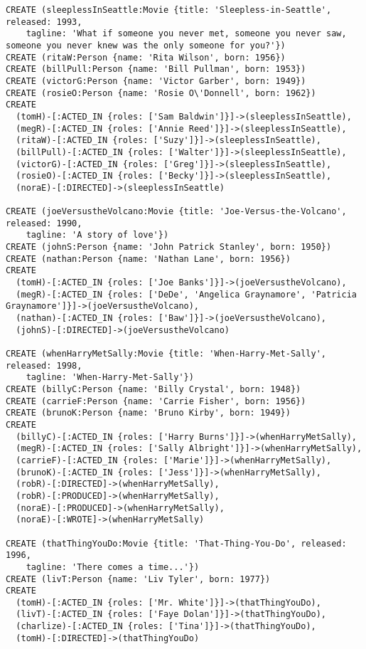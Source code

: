 \begin{lstlisting}
CREATE (sleeplessInSeattle:Movie {title: 'Sleepless-in-Seattle', released: 1993,
    tagline: 'What if someone you never met, someone you never saw, someone you never knew was the only someone for you?'})
CREATE (ritaW:Person {name: 'Rita Wilson', born: 1956})
CREATE (billPull:Person {name: 'Bill Pullman', born: 1953})
CREATE (victorG:Person {name: 'Victor Garber', born: 1949})
CREATE (rosieO:Person {name: 'Rosie O\'Donnell', born: 1962})
CREATE
  (tomH)-[:ACTED_IN {roles: ['Sam Baldwin']}]->(sleeplessInSeattle),
  (megR)-[:ACTED_IN {roles: ['Annie Reed']}]->(sleeplessInSeattle),
  (ritaW)-[:ACTED_IN {roles: ['Suzy']}]->(sleeplessInSeattle),
  (billPull)-[:ACTED_IN {roles: ['Walter']}]->(sleeplessInSeattle),
  (victorG)-[:ACTED_IN {roles: ['Greg']}]->(sleeplessInSeattle),
  (rosieO)-[:ACTED_IN {roles: ['Becky']}]->(sleeplessInSeattle),
  (noraE)-[:DIRECTED]->(sleeplessInSeattle)

CREATE (joeVersustheVolcano:Movie {title: 'Joe-Versus-the-Volcano', released: 1990,
    tagline: 'A story of love'})
CREATE (johnS:Person {name: 'John Patrick Stanley', born: 1950})
CREATE (nathan:Person {name: 'Nathan Lane', born: 1956})
CREATE
  (tomH)-[:ACTED_IN {roles: ['Joe Banks']}]->(joeVersustheVolcano),
  (megR)-[:ACTED_IN {roles: ['DeDe', 'Angelica Graynamore', 'Patricia Graynamore']}]->(joeVersustheVolcano),
  (nathan)-[:ACTED_IN {roles: ['Baw']}]->(joeVersustheVolcano),
  (johnS)-[:DIRECTED]->(joeVersustheVolcano)

CREATE (whenHarryMetSally:Movie {title: 'When-Harry-Met-Sally', released: 1998,
    tagline: 'When-Harry-Met-Sally'})
CREATE (billyC:Person {name: 'Billy Crystal', born: 1948})
CREATE (carrieF:Person {name: 'Carrie Fisher', born: 1956})
CREATE (brunoK:Person {name: 'Bruno Kirby', born: 1949})
CREATE
  (billyC)-[:ACTED_IN {roles: ['Harry Burns']}]->(whenHarryMetSally),
  (megR)-[:ACTED_IN {roles: ['Sally Albright']}]->(whenHarryMetSally),
  (carrieF)-[:ACTED_IN {roles: ['Marie']}]->(whenHarryMetSally),
  (brunoK)-[:ACTED_IN {roles: ['Jess']}]->(whenHarryMetSally),
  (robR)-[:DIRECTED]->(whenHarryMetSally),
  (robR)-[:PRODUCED]->(whenHarryMetSally),
  (noraE)-[:PRODUCED]->(whenHarryMetSally),
  (noraE)-[:WROTE]->(whenHarryMetSally)

CREATE (thatThingYouDo:Movie {title: 'That-Thing-You-Do', released: 1996,
    tagline: 'There comes a time...'})
CREATE (livT:Person {name: 'Liv Tyler', born: 1977})
CREATE
  (tomH)-[:ACTED_IN {roles: ['Mr. White']}]->(thatThingYouDo),
  (livT)-[:ACTED_IN {roles: ['Faye Dolan']}]->(thatThingYouDo),
  (charlize)-[:ACTED_IN {roles: ['Tina']}]->(thatThingYouDo),
  (tomH)-[:DIRECTED]->(thatThingYouDo)


\end{lstlisting}
